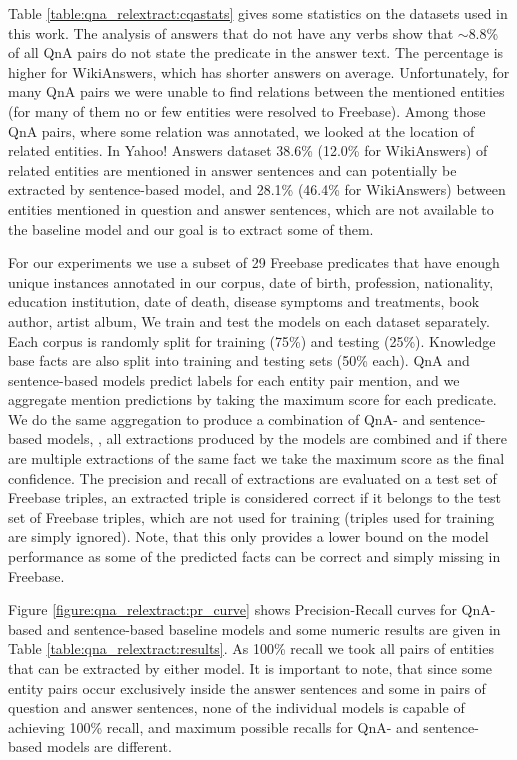 Table \ref{table:qna_relextract:cqastats} gives some statistics on the datasets used in this work.
The analysis of answers that do not have any verbs show that $\sim$8.8\% of all QnA pairs do not state the predicate in the answer text.
The percentage is higher for WikiAnswers, which has shorter answers on average.
Unfortunately, for many QnA pairs we were unable to find relations between the mentioned entities (for many of them no or few entities were resolved to Freebase).
Among those QnA pairs, where some relation was annotated, we looked at the location of related entities.
In Yahoo! Answers dataset 38.6\% (12.0\% for WikiAnswers) of related entities are mentioned in answer sentences and can potentially be extracted by sentence-based model, and 28.1\% (46.4\% for WikiAnswers) between entities mentioned in question and answer sentences, which are not available to the baseline model and our goal is to extract some of them.

For our experiments we use a subset of 29 Freebase predicates that have enough unique instances annotated in our corpus, \eg date of birth, profession, nationality, education institution, date of death, disease symptoms and treatments, book author, artist album, \etc
We train and test the models on each dataset separately.
Each corpus is randomly split for training (75\%) and testing (25\%).
Knowledge base facts are also split into training and testing sets (50\% each).
QnA and sentence-based models predict labels for each entity pair mention, and we aggregate mention predictions by taking the maximum score for each predicate.
We do the same aggregation to produce a combination of QnA- and sentence-based models, \ie, all extractions produced by the models are combined and if there are multiple extractions of the same fact we take the maximum score as the final confidence.
The precision and recall of extractions are evaluated on a test set of Freebase triples, \ie an extracted triple is considered correct if it belongs to the test set of Freebase triples, which are not used for training (triples used for training are simply ignored).
Note, that this only provides a lower bound on the model performance as some of the predicted facts can be correct and simply missing in Freebase.

Figure \ref{figure:qna_relextract:pr_curve} shows Precision-Recall curves for QnA-based and sentence-based baseline models and some numeric results are given in Table \ref{table:qna_relextract:results}.
As 100\% recall we took all pairs of entities that can be extracted by either model.
It is important to note, that since some entity pairs occur exclusively inside the answer sentences and some in pairs of question and answer sentences, none of the individual models is capable of achieving 100\% recall, and maximum possible recalls for QnA- and sentence-based models are different.

